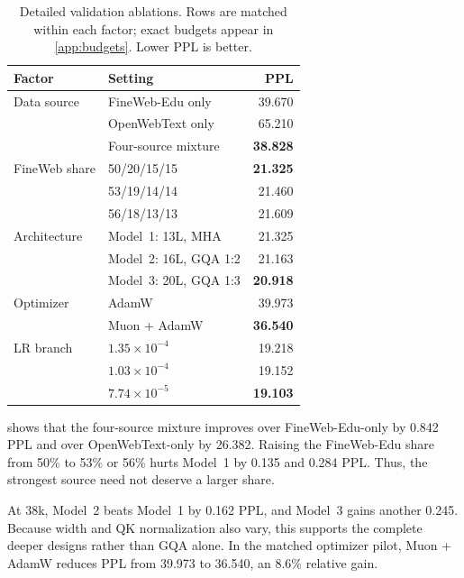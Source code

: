 \documentclass{article}
\begin{document}
\begin{table}[H]
  \caption{Detailed validation ablations. Rows are matched within each factor;
  exact budgets appear in \cref{app:budgets}. Lower PPL is better.}
  \label{tab:ablations}
  \centering
  \normalsize
  \renewcommand{\arraystretch}{1.06}
  \setlength{\tabcolsep}{12pt}
  \begin{tabular}{@{}llr@{}}
    \toprule
    Factor & Setting & PPL \\
    \midrule
    Data source & FineWeb-Edu only & 39.670 \\
                & OpenWebText only & 65.210 \\
                & Four-source mixture & \textbf{38.828} \\
    \midrule
    FineWeb share & 50/20/15/15 & \textbf{21.325} \\
                  & 53/19/14/14 & 21.460 \\
                  & 56/18/13/13 & 21.609 \\
    \midrule
    Architecture & Model~1: 13L, MHA & 21.325 \\
                 & Model~2: 16L, GQA 1:2 & 21.163 \\
                 & Model~3: 20L, GQA 1:3 & \textbf{20.918} \\
    \midrule
    Optimizer & AdamW & 39.973 \\
              & Muon + AdamW & \textbf{36.540} \\
    \midrule
    LR branch & $1.35{\times}10^{-4}$ & 19.218 \\
              & $1.03{\times}10^{-4}$ & 19.152 \\
              & $7.74{\times}10^{-5}$ & \textbf{19.103} \\
    \bottomrule
  \end{tabular}
\end{table}

 shows that the four-source mixture improves over
FineWeb-Edu-only by 0.842 PPL and over OpenWebText-only by 26.382. Raising the
FineWeb-Edu share from 50\% to 53\% or 56\% hurts Model~1 by 0.135 and 0.284
PPL. Thus, the strongest source need not deserve a larger share.

At 38k, Model~2 beats Model~1 by 0.162 PPL, and Model~3 gains another 0.245.
Because width and QK normalization also vary, this supports the complete
deeper designs rather than GQA alone. In the matched optimizer pilot, Muon +
AdamW reduces PPL from 39.973 to 36.540, an 8.6\% relative gain.
\end{document}
